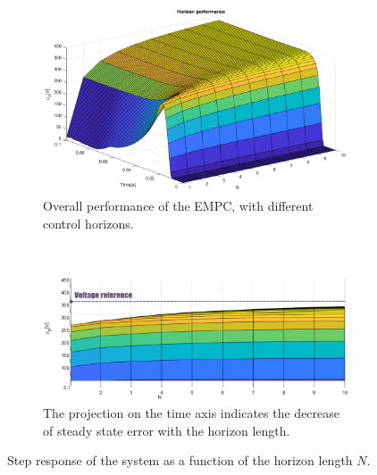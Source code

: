     \begin{figure}
                \centering
                \begin{subfigure}[b]{\textwidth}
                    \includegraphics[width=\textwidth]{EMPC_PNG_Pics/MultiHorizon2_trans.png}
                    \caption{\centering Overall performance of the EMPC, with different control horizons.}
                    \label{EMPC:fig:MultiHorizon_a}
                \end{subfigure}
                ~ %
                \begin{subfigure}[b]{\textwidth}
                    \includegraphics[width=\textwidth]{EMPC_PNG_Pics/HorizonPerformace_trans.png}
                    \caption{\centering The projection on the time axis indicates the decrease of steady state error with the horizon length.}
                    \label{EMPC:fig:MultiHorizon_b}
                \end{subfigure}
                \caption{Step response of the system as a function of the horizon length $N$.}\label{EMPC:fig:MultiHorizon}
            \end{figure}

